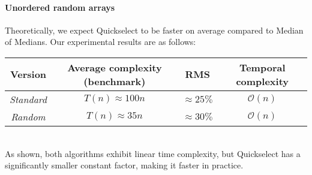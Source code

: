 \documentclass[paper=a4, fontsize=12pt]{scrartcl}
\numberwithin{equation}{section}
\numberwithin{figure}{section}
\numberwithin{table}{section}
\begin{document}
    \paragraph{Unordered random arrays}
    Theoretically, we expect Quickselect to be faster on average compared to Median of Medians.
    Our experimental results are as follows:
    \begin{table}[!ht]
        \centering
        \begin{tabular}{|c|c|c|c|}
        \hline
        \textbf{Version}  & \textbf{Average complexity (benchmark)} & \textbf{RMS} & \textbf{Temporal complexity}      \\ \hline
        \textit{Standard} & $T(n) \approx 100n$      &             $\approx 25\%$                & $\mathcal{O}(n)$             \\
        \textit{Random}   & $T(n) \approx 35n$       &           $\approx 30\%$                  & $\mathcal{O}(n)$             \\ \hline
        \end{tabular}
    \end{table}\\
    As shown, both algorithms exhibit linear time complexity, but Quickselect has a significantly smaller constant factor, making it faster in practice.
\end{document}
